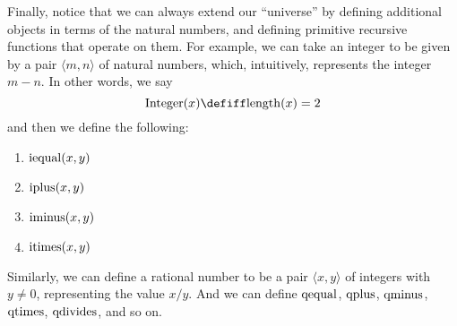 \documentclass[../../../include/open-logic-section]{subfiles}
\begin{document}
Finally, notice that we can always extend our ``universe'' by defining
additional objects in terms of the natural numbers, and defining
primitive recursive functions that operate on them. For example, we
can take an integer to be given by a pair $\langle m, n \rangle$ of natural
numbers, which, intuitively, represents the integer $m-n$. In other
words, we say
\[
\fn{Integer}(x) \defiff \fn{length}(x) = 2
\]
and then we define the following:
\begin{enumerate}
\item $\mathrm{iequal}(x,y)$
\item $\mathrm{iplus}(x,y)$
\item $\mathrm{iminus}(x,y)$
\item $\mathrm{itimes}(x,y)$
\end{enumerate}
Similarly, we can define a rational number to be a pair $\langle x, y \rangle$
of integers with $y \neq 0$, representing the value $x / y$. And we
can define $\mathrm{qequal}$, $\mathrm{qplus}$, $\mathrm{qminus}$, $\mathrm{qtimes}$,
$\mathrm{qdivides}$, and so on.
\end{document}
